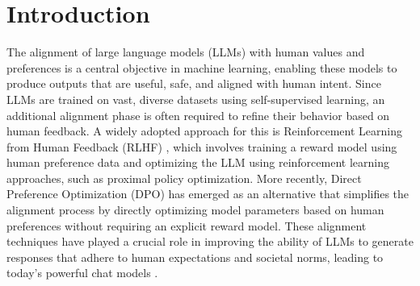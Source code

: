 \section{Introduction}\label{sec:introduction}
The alignment of large language models (LLMs) with human values and preferences is a central objective in machine learning, enabling these models to produce outputs that are useful, safe, and aligned with human intent. Since LLMs are trained on vast, diverse datasets using self-supervised learning, an additional alignment phase is often required to refine their behavior based on human feedback. A widely adopted approach for this is Reinforcement Learning from Human Feedback (RLHF)  \citep{christiano2017deep, ziegler2019fine, ouyang2022training}, which involves training a reward model using human preference data and optimizing the LLM  using reinforcement learning approaches, such as proximal policy optimization. More recently, Direct Preference Optimization (DPO) has emerged as an alternative that simplifies the alignment process by directly optimizing model parameters based on human preferences without requiring an explicit reward model. These alignment techniques have played a crucial role in improving the ability of LLMs to generate responses that adhere to human expectations and societal norms, leading to today's powerful chat models \citep{achiam2023gpt, touvron2023llama}. 


